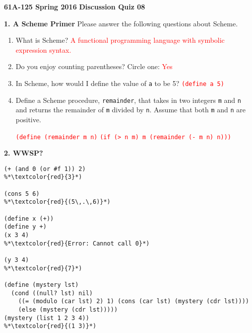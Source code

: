 \documentclass[11pt]{article}
\begin{document}
\textbf{61A-125 Spring 2016}\newline
\textbf{Discussion Quiz 08}\newline

\textbf{1. A Scheme Primer}\newline
Please answer the following questions about Scheme.

\begin{enumerate}[leftmargin=0.63cm,itemindent=0cm,labelwidth=\itemindent,label=(\alph*)]
\item What is Scheme? \textcolor{red}{A functional programming language with symbolic expression syntax.}

\item Do you enjoy counting parentheses? Circle one: \textcolor{red}{Yes}

\item In Scheme, how would I define the value of \texttt{a} to be 5? \textcolor{red}{\texttt{(define a 5)}}

\item Define a Scheme procedure, \texttt{remainder}, that takes in two integers \texttt{m} and \texttt{n} and returns the remainder of \texttt{m} divided by \texttt{n}. Assume that both \texttt{m} and \texttt{n} are positive.\newline

\textcolor{red}{\texttt{(define (remainder m n)}}\newline
\textcolor{red}{\texttt{\enspace\enspace(if (> n m) m (remainder (- m n) n)))}}\newline

\end{enumerate}

\textbf{2. WWSP?}
\begin{lstlisting}
(+ (and 0 (or #f 1)) 2)
%*\textcolor{red}{3}*)

(cons 5 6)
%*\textcolor{red}{(5\,.\,6)}*)

(define x (+))
(define y +)
(x 3 4)
%*\textcolor{red}{Error: Cannot call 0}*)

(y 3 4)
%*\textcolor{red}{7}*)

(define (mystery lst)
  (cond ((null? lst) nil)
    ((= (modulo (car lst) 2) 1) (cons (car lst) (mystery (cdr lst))))
    (else (mystery (cdr lst)))))
(mystery (list 1 2 3 4))
%*\textcolor{red}{(1 3)}*)
\end{lstlisting}
\end{document}
